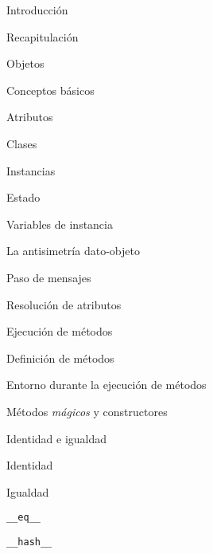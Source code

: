 \begin{longenum}
    \begin{longenum}
        \item Introducción
        \begin{longenum}
            \item Recapitulación
            \item Objetos
        \end{longenum}
        \item Conceptos básicos
        \begin{longenum}
            \item Atributos
            \item Clases
            \begin{longenum}
                \item Instancias
            \end{longenum}
            \item Estado
            \begin{longenum}
                \item Variables de instancia
            \end{longenum}
            \item La antisimetría dato-objeto
        \end{longenum}
        \item Paso de mensajes
        \begin{longenum}
            \item Resolución de atributos
            \item Ejecución de métodos
            \item Definición de métodos
            \begin{longenum}
                \item Entorno durante la ejecución de métodos
            \end{longenum}
            \item Métodos \textit{mágicos} y constructores
        \end{longenum}
        \item Identidad e igualdad
        \begin{longenum}
            \item Identidad
            \item Igualdad
            \begin{longenum}
                \item \texttt{\_\_eq\_\_}
                \item \texttt{\_\_hash\_\_}
            \end{longenum}

\end{longenum}
\end{longenum}
\end{longenum}
